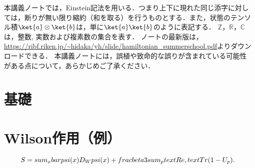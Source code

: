 \documentclass[
  letterpaper,
]{book}
\begin{document}
本講義ノートでは，Einstein記法を用いる．つまり上下に現れた同じ添字に対しては，断りが無い限り縮約（和を取る）を行うものとする．また，状態のテンソル積\(\ket{a}\otimes \ket{b}\)は，単に\(\ket{a}\ket{b}\)のように表記する．
\(\mathbb{Z}\)，\(\mathbb{R}\)，\(\mathbb{C}\)は，整数,
実数および複素数の集合を表す．
ノートの最新版は，\href{https://ribf.riken.jp/~hidaka/yh/slide/hamiltonian_summerschool.pdf}{https://ribf.riken.jp/\textasciitilde hidaka/yh/slide/hamiltonian\_summerschool.pdf}よりダウンロードできる．
本講義ノートには，誤植や致命的な誤りが含まれている可能性がある点について，あらかじめご了承ください．


\chapter{基礎}\label{ux57faux790e}


\chapter{Wilson作用（例）}\label{wilsonux4f5cux7528ux4f8b}

\[ S = \\sum_x \\bar\\psi(x) D_W \\psi(x) + \\frac{\\beta}{3} \\sum_{p} \\text{Re}\\,\\text{Tr}(1-U_p). \]


\backmatter
\end{document}
